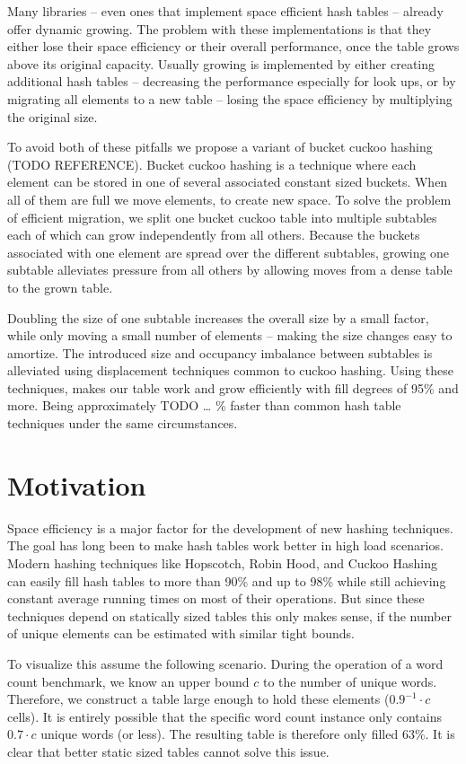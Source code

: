 \documentclass[a4paper,UKenglish]{lipics-v2016}
\begin{document}
Many libraries -- even ones that implement space efficient hash tables
-- already offer dynamic growing.  The problem with these
implementations is that they either lose their space efficiency or
their overall performance, once the table grows above its original
capacity.  Usually growing is implemented by either creating
additional hash tables -- decreasing the performance especially for
look ups, or by migrating all elements to a new table -- losing the
space efficiency by multiplying the original size.

To avoid both of these pitfalls we propose a variant of bucket cuckoo
hashing (TODO REFERENCE).  Bucket cuckoo hashing is a technique where
each element can be stored in one of several associated constant sized
buckets.  When all of them are full we move elements, to create new
space.  To solve the problem of efficient migration, we split one
bucket cuckoo table into multiple subtables each of which can grow
independently from all others.  Because the buckets associated with
one element are spread over the different subtables, growing one
subtable alleviates pressure from all others by allowing moves from a
dense table to the grown table.

Doubling the size of one subtable increases the overall size by a
small factor, while only moving a small number of elements -- making
the size changes easy to amortize. The introduced size and occupancy
imbalance between subtables is alleviated using displacement
techniques common to cuckoo hashing. Using these techniques, makes our
table work and grow efficiently with fill degrees of 95\% and more.
Being approximately TODO \ldots{} \% faster than common hash table
techniques under the same circumstances.

\section{Motivation}
\label{sec:motication}
Space efficiency is a major factor for the development of new hashing
techniques.  The goal has long been to make hash tables work better in
high load scenarios.  Modern hashing techniques like Hopscotch, Robin
Hood, and Cuckoo Hashing can easily fill hash tables to more than 90\%
and up to 98\% while still achieving constant average running times on
most of their operations.  But since these techniques depend on
statically sized tables this only makes sense, if the number of unique
elements can be estimated with similar tight bounds.

To visualize this assume the following scenario.  During the operation
of a word count benchmark, we know an upper bound $c$ to the number of
unique words. Therefore, we construct a table large enough to hold
these elements ($0.9^{-1}\cdot c$ cells).  It is entirely possible
that the specific word count instance only contains $0.7\cdot c$
unique words (or less).  The resulting table is therefore only filled
63\%.  It is clear that better static sized tables cannot solve this
issue.
\end{document}
